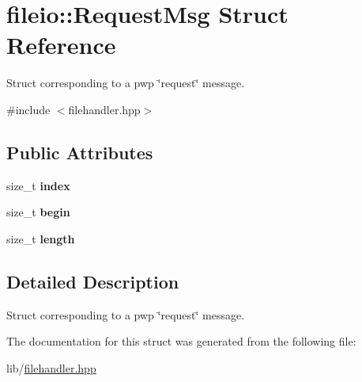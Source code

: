 \hypertarget{structfileio_1_1RequestMsg}{}\section{fileio\+:\+:Request\+Msg Struct Reference}
\label{structfileio_1_1RequestMsg}


Struct corresponding to a pwp \char`\"{}request\char`\"{} message.  




{\ttfamily \#include $<$filehandler.\+hpp$>$}

\subsection*{Public Attributes}
\begin{DoxyCompactItemize}
\item 
\mbox{\label{structfileio_1_1RequestMsg_a49df57e20c5c80d21533667f930dcb8f}} 
size\+\_\+t {\bfseries index}
\item 
\mbox{\label{structfileio_1_1RequestMsg_a0257a69dd2b5568bca0574a2832db7d0}} 
size\+\_\+t {\bfseries begin}
\item 
\mbox{\label{structfileio_1_1RequestMsg_ac44d306b1ebb8c7ef92cc6252f8bb8f9}} 
size\+\_\+t {\bfseries length}
\end{DoxyCompactItemize}


\subsection{Detailed Description}
Struct corresponding to a pwp \char`\"{}request\char`\"{} message. 

The documentation for this struct was generated from the following file\+:\begin{DoxyCompactItemize}
\item 
lib/\hyperlink{filehandler_8hpp}{filehandler.\+hpp}\end{DoxyCompactItemize}
